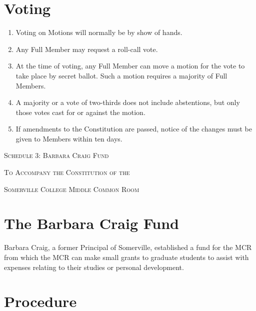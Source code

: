 \documentclass[11pt, a4paper]{article}
\begin{document}
\section{Voting}
\label{sec:meetings_voting}

\begin{enumerate}
	\item Voting on Motions will normally be by show of hands.
    \item Any Full Member may request a roll-call vote.
    \item At the time of voting, any Full Member can move a motion for the vote to take place by secret ballot. Such a motion requires a majority of Full Members.
    \item A majority or a vote of two-thirds does not include abstentions, but only those votes cast for or against the motion.
    \item If amendments to the Constitution are passed, notice of the changes must be given to Members within ten days.
\end{enumerate}





\clearpage
\setcounter{section}{0}





\centerline{{\Huge \textsc{Schedule 3: Barbara Craig Fund}}}
\vspace{2mm}
\centerline{{\Large \textsc{To Accompany the Constitution of the}}}
\vspace{2mm}
\centerline{{\Large \textsc{Somerville College Middle Common Room}}}





\section{The Barbara Craig Fund}
\label{sec:bcf}
Barbara Craig, a former Principal of Somerville, established a fund for the MCR from which the MCR can make small grants to graduate students to assist with expenses relating to their studies or personal development.





\section{Procedure}
\label{sec:procedure}
\end{document}
